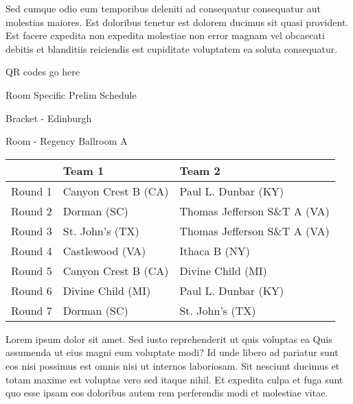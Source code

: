 \documentclass{article}%
\begin{document}
\newline%
Sed cumque odio eum temporibus deleniti ad consequatur consequatur aut molestias maiores. Est doloribus tenetur est dolorem ducimus sit quasi provident. Est facere expedita non expedita molestiae non error magnam vel obcaecati debitis et blanditiis reiciendis est cupiditate voluptatem ea soluta consequatur.%
\vspace*{140pt}%
\begin{center}%
\begin{Huge}%
QR codes go here%
\end{Huge}%
\end{center}%
\newpage%
\begin{center}%
\begin{Huge}%
Room Specific Prelim Schedule%
\end{Huge}%
\vspace*{8pt}%
\linebreak%
\begin{Large}%
Bracket {-} Edinburgh%
\end{Large}%
\vspace*{8pt}%
\linebreak%
\vspace*{8pt}%
\begin{Large}%
Room {-} Regency Ballroom A%
\end{Large}%
\end{center}%
%
\begin{tabularx}{\textwidth}{|c|Y|Y|}%
\hline%
&Team 1&Team 2\\%
\hline%
Round 1&Canyon Crest B (CA)&Paul L. Dunbar (KY)\\%
Round 2&Dorman (SC)&Thomas Jefferson S\&T A (VA)\\%
Round 3&St. John's (TX)&Thomas Jefferson S\&T A (VA)\\%
Round 4&Castlewood (VA)&Ithaca B (NY)\\%
Round 5&Canyon Crest B (CA)&Divine Child (MI)\\%
Round 6&Divine Child (MI)&Paul L. Dunbar (KY)\\%
Round 7&Dorman (SC)&St. John's (TX)\\%
\hline%
\end{tabularx}%
\vspace*{8pt}%
\newline%
Lorem ipsum dolor sit amet. Sed iusto reprehenderit ut quis voluptas ea Quis assumenda ut eius magni eum voluptate modi? Id unde libero ad pariatur sunt eos nisi possimus est omnis nisi ut internos laboriosam. Sit nesciunt ducimus et totam maxime est voluptas vero sed itaque nihil. Et expedita culpa et fuga sunt quo esse ipsam eos doloribus autem rem perferendis modi et molestiae vitae.\newline%
\end{document}
